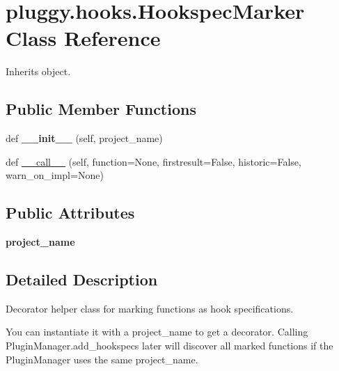 \hypertarget{classpluggy_1_1hooks_1_1_hookspec_marker}{}\section{pluggy.\+hooks.\+Hookspec\+Marker Class Reference}
\label{classpluggy_1_1hooks_1_1_hookspec_marker}


Inherits object.

\subsection*{Public Member Functions}
\begin{DoxyCompactItemize}
\item 
\mbox{\label{classpluggy_1_1hooks_1_1_hookspec_marker_ae73762a434e776871fef8cae699dae85}} 
def {\bfseries \+\_\+\+\_\+init\+\_\+\+\_\+} (self, project\+\_\+name)
\item 
def \hyperlink{classpluggy_1_1hooks_1_1_hookspec_marker_a63b0aeafb61ab27cdf526979102f02ea}{\+\_\+\+\_\+call\+\_\+\+\_\+} (self, function=None, firstresult=False, historic=False, warn\+\_\+on\+\_\+impl=None)
\end{DoxyCompactItemize}
\subsection*{Public Attributes}
\begin{DoxyCompactItemize}
\item 
\mbox{\label{classpluggy_1_1hooks_1_1_hookspec_marker_afc4f9316ff36f3ddc6485b3f7fa224f7}} 
{\bfseries project\+\_\+name}
\end{DoxyCompactItemize}


\subsection{Detailed Description}
\begin{DoxyVerb}Decorator helper class for marking functions as hook specifications.

You can instantiate it with a project_name to get a decorator.
Calling PluginManager.add_hookspecs later will discover all marked functions
if the PluginManager uses the same project_name.
\end{DoxyVerb}
 

